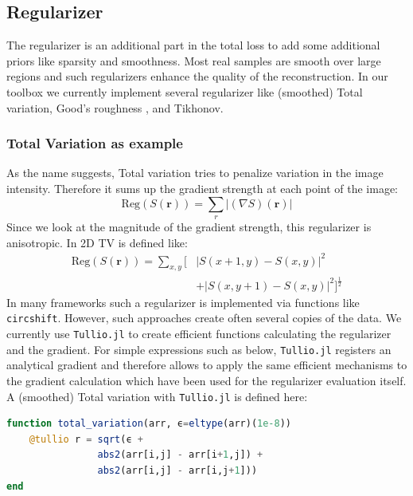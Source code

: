 \documentclass{juliacon}
\begin{document}
\subsection{Regularizer}
    The regularizer is an additional part in the total loss to add some additional priors like sparsity and smoothness.
    Most real samples are smooth over large regions and such regularizers enhance the quality of the reconstruction.
    In our toolbox we currently implement several regularizer like (smoothed) Total variation, Good's roughness \cite{Verveer:98}, \cite{Good:71} and Tikhonov. 
    \subsubsection{Total Variation as example}
        As the name suggests, Total variation tries to penalize variation in the image intensity. Therefore it sums up the gradient strength at each point
        of the image:
        \begin{equation}
            \text{Reg}(S(\mathbf r)) = \sum_r  |(\nabla S)(\mathbf r)|
        \end{equation}
        Since we look at the magnitude of the gradient strength, this regularizer is anisotropic.
        In 2D TV is defined like: 
        \begin{equation}
        \begin{split}
            \text{Reg}(S(\mathbf r)) = \sum_{x,y} \big[& |S(x + 1, y) - S(x, y)|^2 \\[-0.4cm] 
                                                & + |S(x, y + 1) - S(x, y)|^2\big]^{\frac12}
        \end{split}
        \end{equation}
        In many frameworks such a regularizer is implemented via functions like \lstinline{circshift}. 
        However, such approaches create often several copies of the data. 
        We currently use \verb|Tullio.jl|\cite{michael_abbott_2021_5047410} to create efficient functions 
        calculating the regularizer and the gradient. For simple expressions
        such as below, \verb|Tullio.jl| registers an analytical gradient and therefore allows to apply the same efficient mechanisms 
        to the gradient calculation which have been used for the regularizer evaluation itself.
        A (smoothed) Total variation with \verb|Tullio.jl| is defined here:
        \begin{lstlisting}[language = Julia]
function total_variation(arr, ϵ=eltype(arr)(1e-8))
    @tullio r = sqrt(ϵ + 
                abs2(arr[i,j] - arr[i+1,j]) +
                abs2(arr[i,j] - arr[i,j+1]))
end
        \end{lstlisting}
\end{document}
